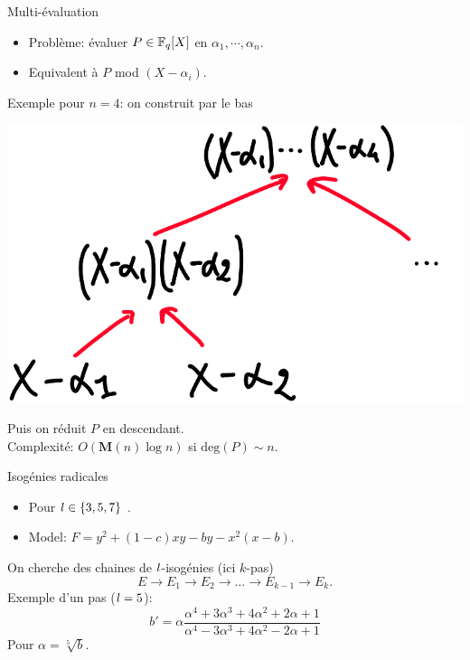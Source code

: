 \documentclass{beamer}
\begin{document}
\begin{frame}{Multi-\'evaluation}
	\begin{itemize}
		\item Probl\`eme:  \'evaluer $P\in\mathbb{F}_q[X]$ en $\alpha_1,\cdots, \alpha_n$.
		\item Equivalent \`a $P$ mod $(X-\alpha_i)$.
	\end{itemize}
	Exemple pour $n=4$: on construit par le bas
	\begin{center}
		\includegraphics[scale=0.2]{../figs/tree}
	\end{center}
	Puis on r\'eduit $P$ en descendant.\\
	Complexit\'e: $O(\mathbf{M}(n)\log n)$ si $\text{deg}(P) \sim n$.
\end{frame}

\begin{frame}{Isog\'enies radicales}
	\begin{itemize}
		\item Pour $\mathnormal{l}\in\left\{3, 5, 7\right\}$ .
		\item Model: $		F = y^2 + (1-c)xy - by - x^2(x-b)$.
	\end{itemize}
	On cherche des chaines de $\mathnormal{l}$-isog\'enies (ici $k$-pas)
\[
	E\rightarrow E_1\rightarrow E_2\rightarrow \dots\rightarrow E_{k-1}\rightarrow E_k.
\]
	Exemple d'un pas ($\mathnormal{l}=5$):
\[
	b' = \alpha\frac{\alpha^4 + 3\alpha^3 + 4\alpha^2 + 2\alpha + 1 }{\alpha^4 - 3\alpha^3 + 4\alpha^2 - 2\alpha + 1}
\]
	Pour $\alpha = \sqrt[5]{b}$.
\end{frame}
\end{document}
